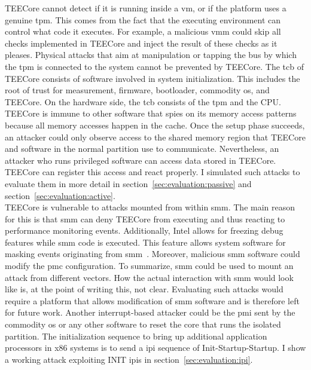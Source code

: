 TEECore cannot detect if it is running inside a \gls{vm}, or if the platform
uses a genuine \gls{tpm}. This comes from the fact that the executing
environment can control what code it executes. For example, a malicious
\gls{vmm} could skip all checks implemented in TEECore and inject the result of
these checks as it pleases. Physical attacks that aim at manipulation or tapping
the bus by which the \gls{tpm} is connected to the system cannot be prevented by
TEECore. The \gls{tcb} of TEECore consists of software involved in system
initialization. This includes the root of trust for measurement, firmware,
bootloader, commodity \gls{os}, and TEECore. On the hardware side, the \gls{tcb}
consists of the \gls{tpm} and the CPU.\\

TEECore is immune to other software that spies on its memory access patterns
because all memory accesses happen in the cache. Once the setup phase succeeds,
an attacker could only observe access to the shared memory region that TEECore
and software in the normal partition use to communicate. Nevertheless, an
attacker who runs privileged software can access data stored in TEECore. TEECore
can register this access and react properly. I simulated such attacks to
evaluate them in more detail in section~\ref{sec:evaluation:passive} and
section~\ref{sec:evaluation:active}.\\

TEECore is vulnerable to attacks mounted from within \gls{smm}. The main reason
for this is that \gls{smm} can deny TEECore from executing and thus reacting to
performance monitoring events. Additionally, Intel allows for freezing debug
features while \gls{smm} code is executed. This feature allows system software
for masking events originating from \gls{smm}~\cite{intel_sdm}. Moreover,
malicious \gls{smm} software could modify the \gls{pmc} configuration. To
summarize, \gls{smm} could be used to mount an attack from different vectors.
How the actual interaction with \gls{smm} would look like is, at the point of
writing this, not clear. Evaluating such attacks would require a platform that
allows modification of \gls{smm} software and is therefore left for future work.
Another interrupt-based attacker could be the \gls{pmi} sent by the commodity
\gls{os} or any other software to reset the core that runs the isolated
partition. The initialization sequence to bring up additional application
processors in x86 systems is to send a \gls{ipi} sequence of
Init-Startup-Startup. I show a working attack exploiting INIT \glspl{ipi} in
section~\ref{sec:evaluation:ipi}.\\

